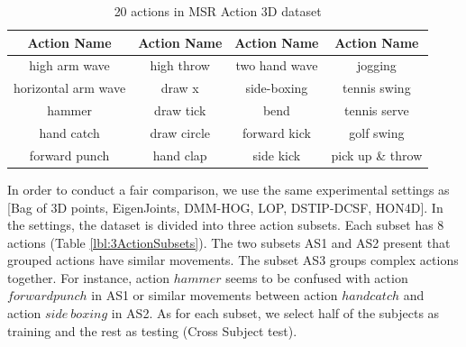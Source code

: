 \documentclass[review]{elsarticle}
\begin{document}
\begin{table}[H]
	\begin{center}
		\begin{tabular}{c|c|c|c}
		
		{\bf Action Name} & {\bf Action Name} & {\bf Action Name} & {\bf Action Name} \\
		\hline
		 high arm wave &     high throw &  two hand wave &        jogging \\
		
		horizontal arm wave &         draw x &    side-boxing &   tennis swing \\
		
		        hammer &      draw tick &           bend &   tennis serve \\
		
		    hand catch &    draw circle &   forward kick &     golf swing \\
		
		 forward punch &      hand clap &      side kick & pick up \& throw \\
		
		\end{tabular}
	\end{center}
	\caption{\label{lbl:20actions}20 actions in MSR Action 3D dataset}
\end{table}

In order to conduct a fair comparison, we use the same experimental settings as [Bag of 3D points, EigenJoints, DMM-HOG, LOP, DSTIP-DCSF, HON4D]. In the settings, the dataset is divided into three action subsets. Each subset has 8 actions (Table \ref{lbl:3ActionSubsets}). The two subsets AS1 and AS2 present that grouped actions have similar movements. The subset AS3 groups complex actions together. For instance, action $hammer$ seems to be confused with action $forward punch$ in AS1 or similar movements between action $hand catch$ and action $side\ boxing$ in AS2. As for each subset, we select half of the subjects as training and the rest as testing (Cross Subject test).
\end{document}
